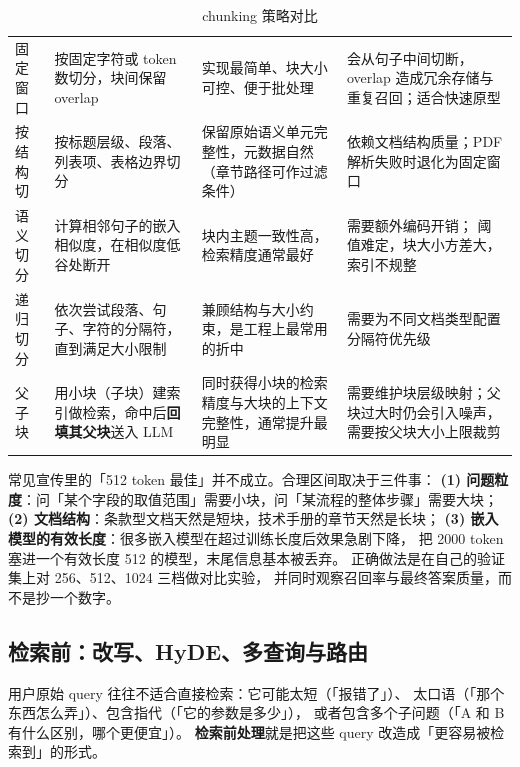 \begin{table}[htbp]
\centering
\caption{chunking 策略对比}
\label{tab:chunking}
\small
\begin{tabularx}{\textwidth}{L{2.2cm} L{4.0cm} L{3.6cm} Y}
\toprule
{} &  &  &  \\
\midrule
固定窗口 & 按固定字符或 token 数切分，块间保留 overlap &
实现最简单、块大小可控、便于批处理 & 会从句子中间切断，
overlap 造成冗余存储与重复召回；适合快速原型 \\
\addlinespace
按结构切 & 按标题层级、段落、列表项、表格边界切分 &
保留原始语义单元完整性，元数据自然（章节路径可作过滤条件） &
依赖文档结构质量；PDF 解析失败时退化为固定窗口 \\
\addlinespace
语义切分 & 计算相邻句子的嵌入相似度，在相似度低谷处断开 &
块内主题一致性高，检索精度通常最好 & 需要额外编码开销；
阈值难定，块大小方差大，索引不规整 \\
\addlinespace
递归切分 & 依次尝试段落、句子、字符的分隔符，直到满足大小限制 &
兼顾结构与大小约束，是工程上最常用的折中 & 需要为不同文档类型配置分隔符优先级 \\
\addlinespace
父子块 & 用小块（子块）建索引做检索，命中后\textbf{回填其父块}送入 LLM &
同时获得小块的检索精度与大块的上下文完整性，通常提升最明显 &
需要维护块层级映射；父块过大时仍会引入噪声，需要按父块大小上限裁剪 \\
\bottomrule
\end{tabularx}
\end{table}

\begin{keypoint}
常见宣传里的「512 token 最佳」并不成立。合理区间取决于三件事：
\textbf{(1) 问题粒度}：问「某个字段的取值范围」需要小块，问「某流程的整体步骤」需要大块；
\textbf{(2) 文档结构}：条款型文档天然是短块，技术手册的章节天然是长块；
\textbf{(3) 嵌入模型的有效长度}：很多嵌入模型在超过训练长度后效果急剧下降，
把 2000 token 塞进一个有效长度 512 的模型，末尾信息基本被丢弃。
正确做法是在自己的验证集上对 256、512、1024 三档做对比实验，
并同时观察召回率与最终答案质量，而不是抄一个数字。
\end{keypoint}

\subsection{检索前：改写、HyDE、多查询与路由}

用户原始 query 往往不适合直接检索：它可能太短（「报错了」）、
太口语（「那个东西怎么弄」）、包含指代（「它的参数是多少」），
或者包含多个子问题（「A 和 B 有什么区别，哪个更便宜」）。
\textbf{检索前处理}就是把这些 query 改造成「更容易被检索到」的形式。

